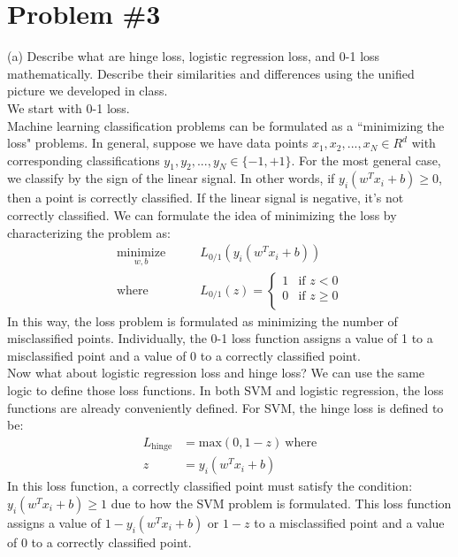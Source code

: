\documentclass[12pt]{article}
\begin{document}
	\section*{Problem \#3}
	(a) Describe what are hinge loss, logistic regression loss, and 0-1 loss mathematically. Describe their similarities and differences using the unified picture we developed in class. \\
	We start with 0-1 loss. \\
	Machine learning classification problems can be formulated as a ``minimizing the loss" problems. In general, suppose we have data points $x_1, x_2, ..., x_N \in R^d$ with corresponding classifications $y_1, y_2, ..., y_N \in \{-1,+1\}$. For the most general case, we classify by the sign of the linear signal. In other words, if $y_i(w^T x_i + b) \ge 0$, then a point is correctly classified. If the linear signal is negative, it's not correctly classified. We can formulate the idea of minimizing the loss by characterizing the problem as:
	 \begin{align*}
	 \underset{w, b}{\text{minimize}} &\qquad L_{0/1} (y_i(w^Tx_i + b)) \\
	 \text{where} &\qquad L_{0/1}(z) = 
	 	\begin{cases}
	 	1 & \text{if } z < 0 \\
	 	0 & \text{if } z \ge 0 \\
	 	\end{cases}
	 \end{align*}
	 In this way, the loss problem is formulated as minimizing the number of misclassified points. Individually, the 0-1 loss function assigns a value of 1 to a misclassified point and a value of 0 to a correctly classified point.
	\\
	Now what about logistic regression loss and hinge loss? We can use the same logic to define those loss functions. 
	In both SVM and logistic regression, the loss functions are already conveniently defined. For SVM, the hinge loss is defined to be:
	\begin{align*}
		L_{\text{hinge}} &= \text{max}(0, 1-z) \ \text{where} \\
		z&= y_i(w^Tx_i+b)
	\end{align*}
	In this loss function, a correctly classified point must satisfy the condition: $y_i(w^Tx_i+b) \ge 1$ due to how the SVM problem is formulated. This loss function assigns a value of $1-y_i(w^Tx_i+b)$ or $1-z$ to a misclassified point and a value of 0 to a correctly classified point. \\
\end{document}
